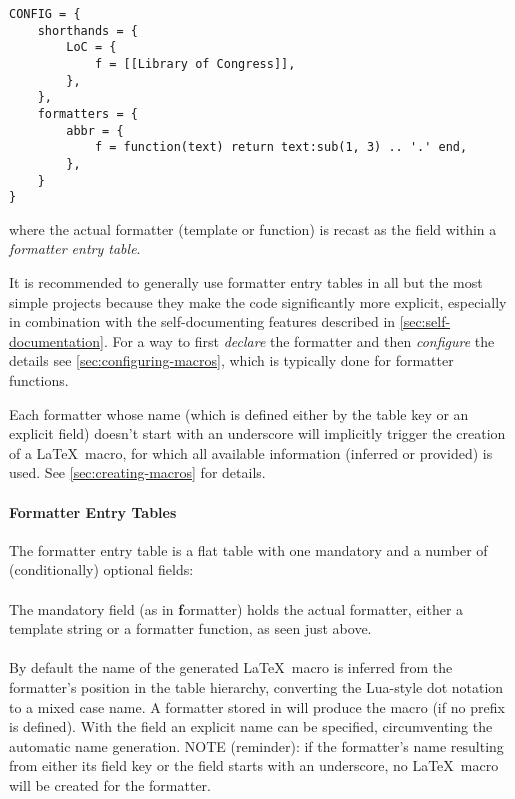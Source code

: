\documentclass{scrartcl}
\begin{document}
\begin{verbatim}
CONFIG = {
    shorthands = {
        LoC = {
            f = [[Library of Congress]],
        },
    },
    formatters = {
        abbr = {
            f = function(text) return text:sub(1, 3) .. '.' end,
        },
    }
}
\end{verbatim}

\noindent where the actual formatter (template or function) is recast as the
 field within a \emph{formatter entry table}.

It is recommended to generally use formatter entry tables in all but the most
simple projects because they make the code significantly more explicit,
especially in combination with the self-documenting features described in
\vref{sec:self-documentation}.  For a way to first \emph{declare} the formatter
and then \emph{configure} the details see \vref{sec:configuring-macros}, which
is typically done for formatter functions.

Each formatter whose name (which is defined either by the table key or an
explicit  field) doesn't start with an underscore will implicitly
trigger the creation of a \LaTeX\ macro, for which all available information
(inferred or provided) is used.  See \vref{sec:creating-macros} for details.


\paragraph{Formatter Entry Tables}

The formatter entry table is a flat table with one mandatory and a number of
(conditionally) optional fields:

\paragraph{}

The mandatory field  (as in \textbf{f}ormatter) holds the actual
formatter, either a template string or a formatter function, as seen just above.


\paragraph{}

By default the name of the generated \LaTeX\ macro is inferred from the
formatter's position in the table hierarchy, converting the Lua-style dot
notation to a mixed case name.  A formatter stored in 
will produce the macro  (if no prefix is defined).  With the
 field an explicit name can be specified, circumventing the
automatic name generation.  NOTE (reminder): if the formatter's name resulting
from either its field key or the  field starts with an underscore,
no \LaTeX\ macro will be created for the formatter.
\end{document}
